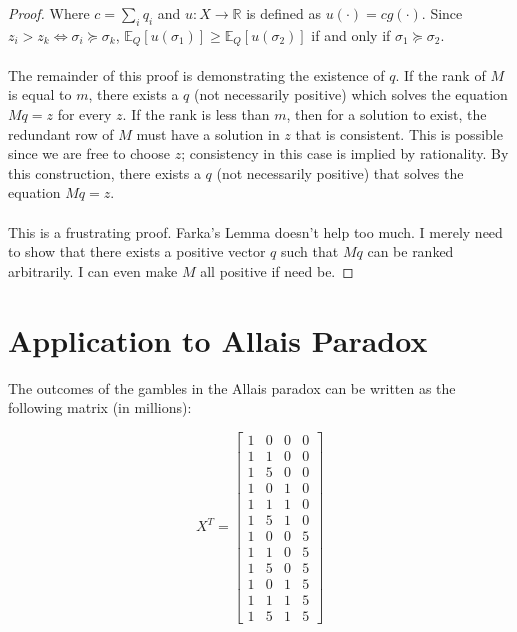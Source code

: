 \documentclass{article}
\begin{document}
\begin{proof}
Where \(c=\sum_i q_i\) and \(u:X \to \mathbb{R}\) is defined as \( u(\cdot)=c g(\cdot)\). Since \(z_i > z_k \Leftrightarrow \sigma_i \succeq \sigma_k\), \(\mathbb{E}_Q\left[u(\sigma_1)\right] \geq \mathbb{E}_Q\left[u(\sigma_2)\right]\) if and only if \(\sigma_1 \succeq \sigma_2\).  
\\
\\
The remainder of this proof is demonstrating the existence of \(q\).  If the rank of \(M\) is equal to \(m\), there exists a \(q\) (not necessarily positive) which solves the equation \(Mq=z\) for every \(z\).  If the rank is less than \(m\), then for a solution to exist, the redundant row of \(M\) must have a solution in \(z\) that is consistent.  This is possible since we are free to choose \(z\); consistency in this case is implied by rationality. By this construction, there exists a \(q\) (not necessarily positive) that solves the equation \(Mq=z\).  
\\
\\
This is a frustrating proof.  Farka's Lemma doesn't help too much.  I merely need to show that there exists a positive vector \(q\) such that \(Mq\) can be ranked arbitrarily.  I can even make \(M\) all positive if need be.




\end{proof}


\section{Application to Allais Paradox}

The outcomes of the gambles in the Allais paradox can be written as the following matrix (in millions):

\[X^T=\begin{bmatrix}
1 & 0 & 0 & 0 \\
1 & 1 & 0 & 0 \\
1 & 5 & 0 & 0 \\
1 & 0 & 1 & 0 \\
1 & 1 & 1 & 0 \\
1 & 5 & 1 & 0 \\
1 & 0 & 0 & 5 \\
1 & 1 & 0 & 5 \\
1 & 5 & 0 & 5 \\
1 & 0 & 1 & 5 \\
1 & 1 & 1 & 5 \\
1 & 5 & 1 & 5
\end{bmatrix}\]
\end{document}
